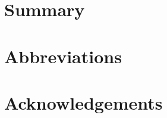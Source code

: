 \documentclass[output=paper]{langsci/langscibook}
\begin{document}
\section{Summary}

\section*{Abbreviations}
\section*{Acknowledgements}

\printbibliography[heading=subbibliography,notkeyword=this] 
\end{document}
